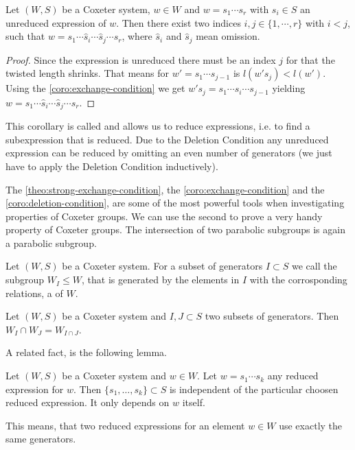 \begin{coro}
	Let $(W,S)$ be a Coxeter system, $w \in W$ and $w = s_1 \cdots s_r$ with $s_i \in S$ an unreduced expression of $w$. Then there exist two indices $i,j \in \{1,\cdots,r\}$ with $i < j$, such that $w = s_1 \cdots \hat s_i \cdots \hat s_j \cdots s_r$, where $\hat s_i$ and $\hat s_j$ mean omission.

	\begin{proof}
		Since the expression is unreduced there must be an index $j$ for that the twisted length shrinks. That means for $w' = s_1 \cdots s_{j-1}$ is $l(w' s_j) < l(w')$. Using the \ref{coro:exchange-condition} we get $w' s_j = s_1 \cdots \hat s_i \cdots s_{j-1}$ yielding $w = s_1 \cdots \hat s_i \cdots \hat s_j \cdots s_r$.
	\end{proof}
\end{coro}

This corollary is called  and allows us to reduce expressions, i.e. to find a subexpression that is reduced. Due to the Deletion Condition any unreduced expression can be reduced by omitting an even number of generators (we just have to apply the Deletion Condition inductively).

The \ref{theo:strong-exchange-condition}, the \ref{coro:exchange-condition} and the \ref{coro:deletion-condition}, are some of the most powerful tools when investigating properties of Coxeter groups. We can use the second to prove a very handy property of Coxeter groups. The intersection of two parabolic subgroups is again a parabolic subgroup.

\begin{defi}
	Let $(W,S)$ be a Coxeter system. For a subset of generators $I \subset S$ we call the subgroup $W_I \leq W$, that is generated by the elements in $I$ with the corrosponding relations, a  of $W$.
\end{defi}

\begin{lemm}
	Let $(W,S)$ be a Coxeter system and $I,J \subset S$ two subsets of generators. Then ${W_I \cap W_J} = W_{I \cap J}$.
\end{lemm}

A related fact, is the following lemma.

\begin{lemm}
	Let $(W,S)$ be a Coxeter system and $w \in W$. Let $w = s_1 \cdots s_k$ any reduced expression for $w$. Then $\{s_1, \ldots, s_k\} \subset S$ is independent of the particular choosen reduced expression. It only depends on $w$ itself.
\end{lemm}

This means, that two reduced expressions for an element $w \in W$ use exactly the same generators.